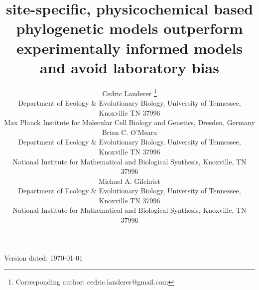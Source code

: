 \documentclass[fleqn,letterpaper]{article}
\begin{document}
\doublespacing
\linenumbers


\newcommand{\Lik}{\ensuremath{\hat{\text{Lik}}}\xspace} %
\newcommand{\GL}{\ensuremath{\text{GL}}\xspace} %
\newcommand{\selacDMS}{\emph{SelAC}+DMS\xspace}
\newcommand{\phydms}{\emph{phydms}\xspace}
\newcommand{\selac}{\emph{SelAC}\xspace}
\newcommand{\phydmsselac}{\emph{phydms+SelAC}\xspace}
\newcommand{\ecoli}{\textit{E. coli}\xspace}
\newcommand{\gy}{\emph{GY94}\xspace}
\newcommand{\hb}{\emph{HB98}\xspace}
\newcommand{\PC}{physicochemical\xspace}  
\newcommand{\DeltaAIC}{\ensuremath{\Delta\text{AIC}}\xspace}  

\makeatletter
\long{}
\makeatother

  
\title{site-specific, \PC based phylogenetic models outperform experimentally informed models and avoid laboratory bias}



\author{
  Cedric Landerer \thanks{Corresponding author: cedric.landerer@gmail.com}\\
  \small  Department of Ecology \& Evolutionary  Biology, University of Tennessee, Knoxville TN 37996\\
  \small Max Planck Institute for Molecular Cell Biology and Genetics, Dresden, Germany\\
  Brian C. O'Meara \\
  \small  Department of Ecology \& Evolutionary  Biology, University of Tennessee, Knoxville TN 37996\\
  \small National Institute for Mathematical and Biological Synthesis, Knoxville, TN 37996\\
  Michael A. Gilchrist\\
  \small  Department of Ecology \& Evolutionary  Biology, University of Tennessee, Knoxville TN 37996\\
  \small National Institute for Mathematical and Biological Synthesis, Knoxville, TN 37996\\
}



\maketitle

\vfill
\centerline{Version dated: \today}
\vfill
\newpage
\end{document}
